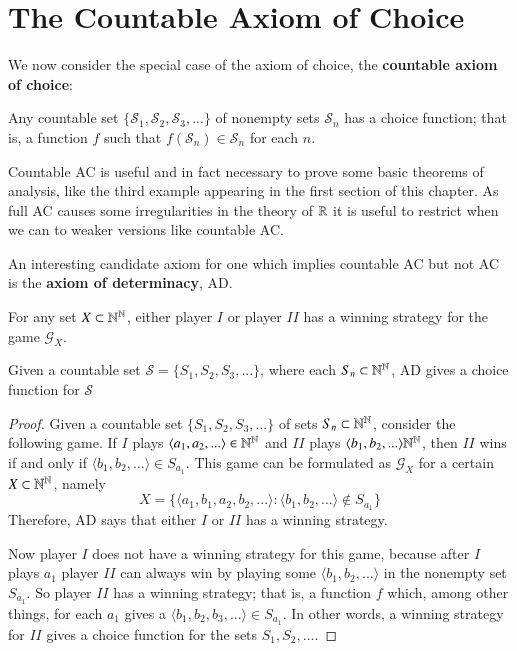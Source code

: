 \documentclass[12pt, a4paper, oneside, openright, titlepage]{book}
\begin{document}
\section{The Countable Axiom of Choice}

We now consider the special case of the axiom of choice, the \textbf{countable axiom of choice}:

\begin{defn}[Countable AC]
    Any countable set $\{\mathcal{S}_1,\mathcal{S}_2,\mathcal{S}_3,...\}$ of nonempty sets $\mathcal{S}_n$ has a choice function; that is, a function $f$ such that $f(\mathcal{S}_n) \in \mathcal{S}_n$ for each $n$.
\end{defn}

Countable AC is useful and in fact necessary to prove some basic theorems of analysis, like the third example appearing in the first section of this chapter. As full AC causes some irregularities in the theory of $\mathbb R$ it is useful to restrict when we can to weaker versions like countable AC.

An interesting candidate axiom for one which implies countable AC but not AC is the \textbf{axiom of determinacy}, AD.

\begin{defn}
    For any set $X \subset \mathbb N^{\mathbb N}$, either player $I$ or player $II$ has a winning strategy for the game $\mathcal{G}_X$.
\end{defn}

\begin{thm}
    Given a countable set $\mathcal{S} = \{S_1,S_2,S_3,...\}$, where each $S_n \subset \mathbb N^{\mathbb N}$, AD gives a choice function for $\mathcal{S}$
\end{thm}
\begin{proof}
    Given a countable set $\{S_1,S_2,S_3,...\}$ of sets $S_n \subset \mathbb N^{\mathbb N}$, consider the following game. If $I$ plays $\langle a_1,a_2,...\rangle \in \mathbb N^{\mathbb N}$ and $II$ plays $\langle b_1,b_2,...\rangle \mathbb N^{\mathbb N}$, then $II$ wins if and only if $\langle b_1,b_2,...\rangle \in S_{a_1}$. This game can be formulated as $\mathcal{G}_X$ for a certain $X \subset \mathbb N^{\mathbb N}$, namely $$X = \{\langle a_1,b_1,a_2,b_2,...\rangle:\langle b_1,b_2,...\rangle \notin S_{a_1}\}$$
    Therefore, AD says that either $I$ or $II$ has a winning strategy.

    Now player $I$ does not have a winning strategy for this game, because after $I$ plays $a_1$ player $II$ can always win by playing some $\langle b_1,b_2,...\rangle$ in the nonempty set $S_{a_1}$. So player $II$ has a winning strategy; that is, a function $f$ which, among other things, for each $a_1$ gives a $\langle b_1,b_2,b_3,...\rangle \in S_{a_1}$. In other words, a winning strategy for $II$ gives a choice function for the sets $S_1,S_2,...$.
\end{proof}
\end{document}
